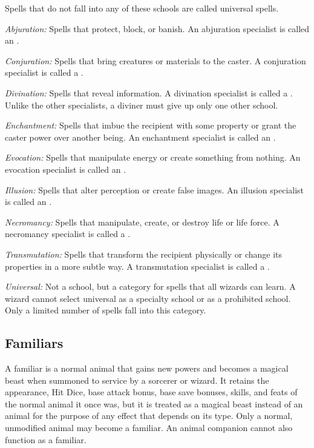 Spells that do not fall into any of these schools are called universal spells.

\textit{Abjuration:} Spells that protect, block, or banish. An abjuration specialist is called an .

\textit{Conjuration:} Spells that bring creatures or materials to the caster. A conjuration specialist is called a .

\textit{Divination:} Spells that reveal information. A divination specialist is called a . Unlike the other specialists, a diviner must give up only one other school.

\textit{Enchantment:} Spells that imbue the recipient with some property or grant the caster power over another being. An enchantment specialist is called an .

\textit{Evocation:} Spells that manipulate energy or create something from nothing. An evocation specialist is called an .

\textit{Illusion:} Spells that alter perception or create false images. An illusion specialist is called an .

\textit{Necromancy:} Spells that manipulate, create, or destroy life or life force. A necromancy specialist is called a .

\textit{Transmutation:} Spells that transform the recipient physically or change its properties in a more subtle way. A transmutation specialist is called a .

\textit{Universal:} Not a school, but a category for spells that all wizards can learn. A wizard cannot select universal as a specialty school or as a prohibited school. Only a limited number of spells fall into this category.

\subsection{Familiars}

A familiar is a normal animal that gains new powers and becomes a magical beast when summoned to service by a sorcerer or wizard. It retains the appearance, Hit Dice, base attack bonus, base save bonuses, skills, and feats of the normal animal it once was, but it is treated as a magical beast instead of an animal for the purpose of any effect that depends on its type. Only a normal, unmodified animal may become a familiar. An animal companion cannot also function as a familiar.

